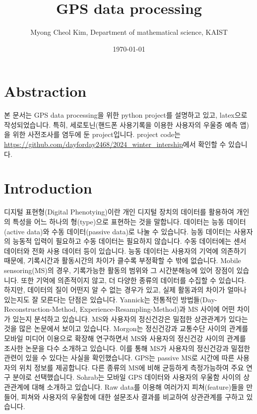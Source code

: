 \documentclass{oblivoir}
\title{GPS data processing}
\author{Myong Cheol Kim, Department of mathematical science, KAIST}
\date{\today}
\begin{document}
  \maketitle
  \chapter{Abstraction}
  본 문서는 GPS data processing을 위한 python project를 설명하고 있고, latex으로 작성되었습니다.
  특히, 세로토닌(핸드폰 사용기록을 이용한 사용자의 우울증 예측 앱)을 위한 사전조사를 염두에 둔 project입니다.
  project code는 \url{https://github.com/dayforday2468/2024_winter_intership}에서 확인할 수 있습니다.

  \chapter{Introduction}
  디지털 표현형(Digital Phenotying)이란 개인 디지털 장치의 데이터를 활용하여 개인의 특성을 어느 하나의 형(type)으로 표현하는 것을 말합니다.
  데이터는 능동 데이터(active data)와 수동 데이터(passive data)로 나눌 수 있습니다. 능동 데이터는 사용자의 능동적 입력이 필요하고 수동 데이터는 필요하지 않습니다.
  수동 데이터에는 센서 데이터와 전화 사용 데이터 등이 있습니다. 능동 데이터는 사용자의 기억에 의존하기 때문에, 기록시간과 활동시간의 차이가 클수록 부정확할 수 밖에 없습니다.
  Mobile sensoring(MS)의 경우, 기록가능한 활동의 범위와 그 시간분해능에 있어 장점이 있습니다. 또한 기억에 의존적이지 않고, 더 다양한 종류의 데이터를 수집할 수 있습니다.
  하지만, 데이터의 질이 어떤지 알 수 없는 경우가 있고, 실제 활동과의 차이가 얼마나 있는지도 잘 모른다는 단점은 있습니다.
  Yannick\cite{Yannick}는 전통적인 방법들(Day-Reconstruction-Method, Experience-Resampling-Method)과 MS 사이에 어떤 차이가 있는지 분석하고 있습니다.\newline
  MS와 사용자의 정신건강은 밀접한 상관관계가 있다는 것을 많은 논문에서 보이고 있습니다.
  Morgon\cite{Morgon}는 정신건강과 교통수단 사이의 관계를 모바일 미디어 이용으로 확장해 연구하면서 MS와 사용자의 정신건강 사이의 관계를 조사한 논문을 다수 소개하고 있습니다.
  이를 통해 MS가 사용자의 정신건강과 밀접한 관련이 있을 수 있다는 사실을 확인했습니다.\newline
  GPS는 passive MS로 시간에 따른 사용자의 위치 정보를 제공합니다. 다른 종류의 MS에 비해 균등하게 측정가능하여 주요 연구 분야로 선택했습니다.
  Sohrab\cite{Sohrab}는 모바일 GPS 데이터와 사용자의 우울함 사이의 상관관계에 대해 소개하고 있습니다.
  Raw data를 이용해 여러가지 피쳐(feature)들을 만들어, 피쳐와 사용자의 우울함에 대한 설문조사 결과를 비교하여 상관관계를 구하고 있습니다.
\end{document}
